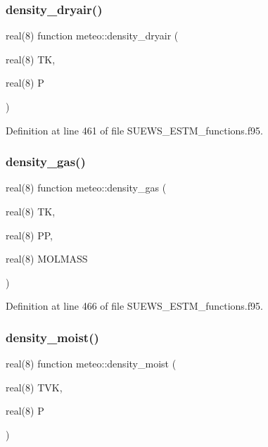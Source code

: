 \subsubsection{\texorpdfstring{density\+\_\+dryair()}{density\_dryair()}}
{\footnotesize\ttfamily real(8) function meteo\+::density\+\_\+dryair (\begin{DoxyParamCaption}\item[{real(8)}]{TK,  }\item[{real(8)}]{P }\end{DoxyParamCaption})}



Definition at line 461 of file S\+U\+E\+W\+S\+\_\+\+E\+S\+T\+M\+\_\+functions.\+f95.

\mbox{\label{namespacemeteo_a5c26a948b622d4d5ffd1f16f755e3c96}} 
\subsubsection{\texorpdfstring{density\+\_\+gas()}{density\_gas()}}
{\footnotesize\ttfamily real(8) function meteo\+::density\+\_\+gas (\begin{DoxyParamCaption}\item[{real(8)}]{TK,  }\item[{real(8)}]{PP,  }\item[{real(8)}]{M\+O\+L\+M\+A\+SS }\end{DoxyParamCaption})}



Definition at line 466 of file S\+U\+E\+W\+S\+\_\+\+E\+S\+T\+M\+\_\+functions.\+f95.

\mbox{\label{namespacemeteo_afeb4cd9d5827418a587e1b78093b08f5}} 
\subsubsection{\texorpdfstring{density\+\_\+moist()}{density\_moist()}}
{\footnotesize\ttfamily real(8) function meteo\+::density\+\_\+moist (\begin{DoxyParamCaption}\item[{real(8)}]{T\+VK,  }\item[{real(8)}]{P }\end{DoxyParamCaption})}




